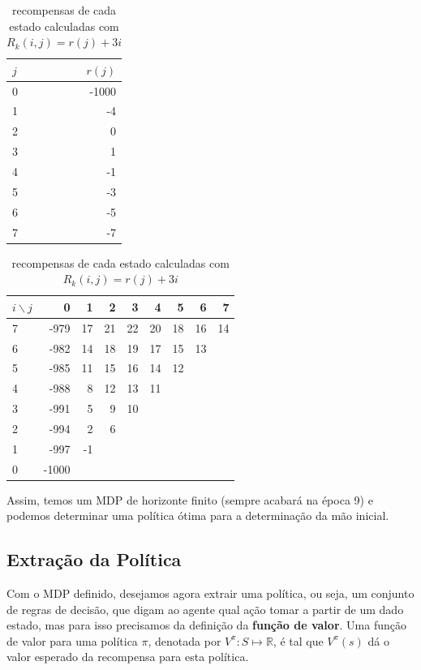 \documentclass[dvipsnames]{book}
\begin{document}
\begin{table}[!h]
\parbox{.45\linewidth}{
\centering
\vspace{0.2cm}
\begin{tabular}{l|r}
$j$  & $r(j)$ \\ \hline
0 & -1000  \\
1 & -4     \\
2 & 0      \\
3 & 1      \\
4 & -1     \\
5 & -3    \\
6 & -5     \\
7 & -7
\end{tabular}
\caption{recompensas-base para $j = 0, \ldots, 7$}
\label{tab:rj}
}
\hfill
\parbox{.45\linewidth}{
\centering
\begin{tabular}{l|rrrrrrrr}
$i \backslash j$ & 0     & 1  & 2  & 3  & 4  & 5  & 6  & 7  \\ \hline
7 & -979  & 17 & 21 & 22 & 20 & 18 & 16 & 14 \\
6 & -982  & 14 & 18 & 19 & 17 & 15 & 13 &    \\
5 & -985  & 11 & 15 & 16 & 14 & 12 &    &    \\
4 & -988  & 8  & 12 & 13 & 11 &    &    &    \\
3 & -991  & 5  & 9  & 10 &    &    &    &    \\
2 & -994  & 2  & 6  &    &    &    &    &    \\
1 & -997  & -1 &    &    &    &    &    &    \\
0 & -1000 &    &    &    &    &    &    &
\end{tabular}
\caption{recompensas de cada estado calculadas com $R_k(i,j) = r(j) + 3i$}
\label{tab:Rij}
}
\end{table}
Assim, temos um MDP de horizonte finito (sempre acabará na época 9) e podemos determinar uma política ótima para a determinação da mão inicial.

\subsection{Extração da Política}
Com o MDP definido, desejamos agora extrair uma política, ou seja, um conjunto de regras
de decisão, que digam ao agente qual ação tomar a partir de um dado estado, mas para isso
precisamos da definição da \textbf{função de valor}. Uma função de valor para uma política
$\pi$, denotada por $V^\pi: S \mapsto \mathbb{R}$, é tal que $V^\pi(s)$ dá o valor esperado
da recompensa para esta política.
\end{document}

